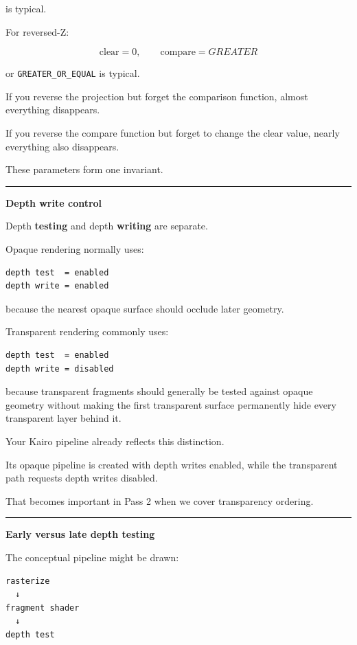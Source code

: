 is typical.

For reversed-Z:

\[
\text{clear}=0,\qquad
\text{compare}=GREATER
\]

or \texttt{GREATER\_OR\_EQUAL} is typical.

If you reverse the projection but forget the comparison function, almost everything disappears.

If you reverse the compare function but forget to change the clear value, nearly everything also disappears.

These parameters form one invariant.

\begin{center}\rule{0.5\linewidth}{0.5pt}\end{center}

\textbf{Depth write control}

Depth \textbf{testing} and depth \textbf{writing} are separate.

Opaque rendering normally uses:

\begin{verbatim}
depth test  = enabled
depth write = enabled
\end{verbatim}

because the nearest opaque surface should occlude later geometry.

Transparent rendering commonly uses:

\begin{verbatim}
depth test  = enabled
depth write = disabled
\end{verbatim}

because transparent fragments should generally be tested against opaque geometry without making the first transparent surface permanently hide every transparent layer behind it.

Your Kairo pipeline already reflects this distinction.

Its opaque pipeline is created with depth writes enabled, while the transparent path requests depth writes disabled.

That becomes important in Pass 2 when we cover transparency ordering.

\begin{center}\rule{0.5\linewidth}{0.5pt}\end{center}

\textbf{Early versus late depth testing}

The conceptual pipeline might be drawn:

\begin{verbatim}
rasterize
  ↓
fragment shader
  ↓
depth test
\end{verbatim}

